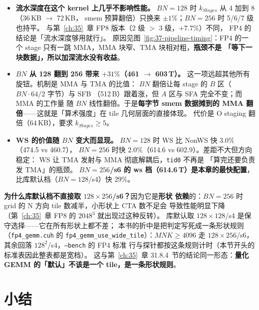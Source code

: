\begin{itemize}[itemsep=2pt,topsep=3pt]
  \item \textbf{流水深度在这个 kernel 上几乎不影响性能。}
        $BN{=}128$ 时 $k_{Stages}$ 从 4 加到 8（36\,KB $\to$ 72\,KB，
        smem 预算翻倍）只换来 $\pm1\%$；$BN{=}256$ 时 5/6/7 级也持平。
        与第~\ref{ch:35}~章 FP8 版本（2 级 $>$ 3 级，$+7.7\%$）不同，
        FP4 的结论是「流水深度够用就行」。
        原因见图~\ref{fig:37-pipeline-timing}：FP4 的一个 stage
        只有一跳 MMA，MMA 块窄、TMA 块相对粗，\textbf{瓶颈不是
        「等下一块数据」，所以加深流水没有收益}。
  \item \textbf{$BN$ 从 128 翻到 256 带来 $+31\%$（461 $\to$ 603\,T）。}
        这一项远超其他所有旋钮。机制是 MMA 与 TMA 的比值：
        $BN$ 翻倍让每 stage 的 $B$ 区（$BN{\cdot}64/2$ 字节）与 SFB
        （512\,B）跟着涨，但 $A$ 区与 SFA 完全不变；而 MMA 的工作量
        随 $BN$ 线性翻倍。于是\textbf{每字节 smem 数据摊到的
        MMA 翻倍}——这就是「算术强度」在 tile 几何层面的直接体现。
        代价是 O staging 翻倍（64\,KB），要求 $k_{Stages}\ge5$。
  \item \textbf{WS 的价值随 $BN$ 变大而显现。}
        $BN{=}128$ 时 WS 比 NonWS 快 $3.0\%$（474.5 vs 460.7），
        $BN{=}256$ 时快 $2.0\%$（614.6 vs 602.9）。差距不大但方向稳定：
        WS 让 TMA 发射与 MMA 彻底解耦后，\texttt{tid0} 不再是
        「算完还要负责发 TMA」的瓶颈。
        \textbf{$BN{=}256$/s6 的 ws 档（614.6\,T）是本章的最快配置}，
        比库默认档（$BN{=}128$/s4）快 $29\%$。
\end{itemize}

\textbf{为什么库默认档不直接取 $128\times256$/s6？}因为它是\textbf{形状
依赖}的：$BN{=}256$ 时 grid 的 N 方向 tile 数减半，小形状上 CTA 数不足会
导致性能明显下降（第~\ref{ch:35}~章 FP8 的 $2048^3$ 就出现过这种反转）。
库默认取 $128\times128$/s4 是保守选择——它在所有形状上都不差；
本书的折中是把判定写死成一条形状规则（\texttt{fp4\_gemm.cuh} 的
\texttt{fp4\_gemm\_\allowbreak use\_wide\_tile}）：$MNK\ge4096$ 走
$128\times256$/s6，其余回落 $128^2$/s4，\texttt{--bench} 的 FP4 标准
行与探针都按这条规则计时（本节开头的标准表因此整表都是宽档）。
这与第~\ref{ch:35}~章 31.8.4~节的结论同一形态：\textbf{量化 GEMM
的「默认」不该是一个 tile，是一条形状规则}。

\section{小结}

